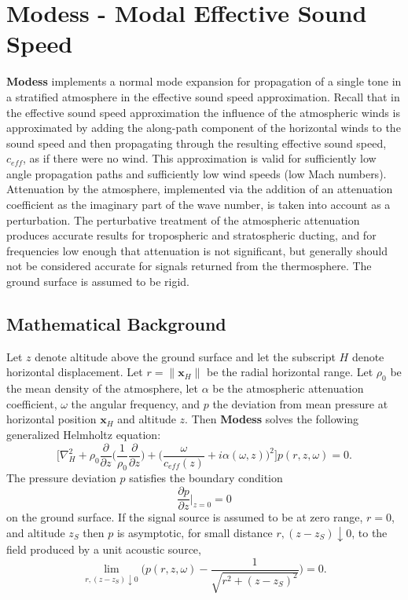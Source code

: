\section{Modess - Modal Effective Sound Speed}
\label{sec: Modess}

{\bf Modess} implements a normal mode expansion for propagation of a single tone in a stratified atmosphere in the effective sound speed approximation. Recall that in the effective sound speed approximation the influence of the atmospheric winds is approximated by adding the along-path component of the horizontal winds to the sound speed and then propagating through the resulting effective sound speed, $c_{eff}$, as if there were no wind. This approximation is valid for sufficiently low angle propagation paths and sufficiently low wind speeds (low Mach numbers). Attenuation by the atmosphere, implemented via the addition of an attenuation coefficient as the imaginary part of the wave number, is taken into account as a perturbation. The perturbative treatment of the atmospheric attenuation produces accurate results for tropospheric and stratospheric ducting, and for frequencies low enough that attenuation is not significant, but generally should not be considered accurate for signals returned from the thermosphere. The ground surface is assumed to be rigid. 

\subsection{Mathematical Background}
\label{sec: modess math}

Let $z$ denote altitude above the ground surface and let the subscript $H$ denote horizontal displacement. Let $r=\|\textbf{x}_{H}\|$ be the radial horizontal range. Let $\rho_0$ be the mean density of the atmosphere, let $\alpha$ be the atmospheric attenuation coefficient, $\omega$ the angular frequency, and $p$ the deviation from mean pressure at horizontal position $\textbf{x}_{H}$ and altitude $z$. Then {\bf Modess} solves the following generalized Helmholtz equation: 
\begin{equation}
\Big[ 
\nabla_{H}^2
+
\rho_0 \frac{\partial}{\partial z} \Big(\frac{1}{\rho_0} \frac{\partial}{\partial z} \Big)  
+
\Big(\frac{\omega}{c_{eff}(z)} + i\alpha (\omega,z)\Big)^2 
\Big] p(r,z,\omega) = 0. 
\label{eq: eff c Helmholtz}
\end{equation}
The pressure deviation $p$ satisfies the boundary condition 
\[
\frac {\partial p}{\partial z}\Big |_{z=0}= 0
\]
on the ground surface. If the signal source is assumed to be at zero range, $r=0$, and altitude $z_S$ then $p$ is asymptotic, for small distance $r,(z-z_S)\downarrow 0$, to the field produced by a unit acoustic source, 
\[
\lim_{r,(z-z_S)\downarrow0}\Big(p(r,z,\omega)-\frac{1}{\sqrt{r^2+(z-z_S)^2}}\Big)=0.
\]

